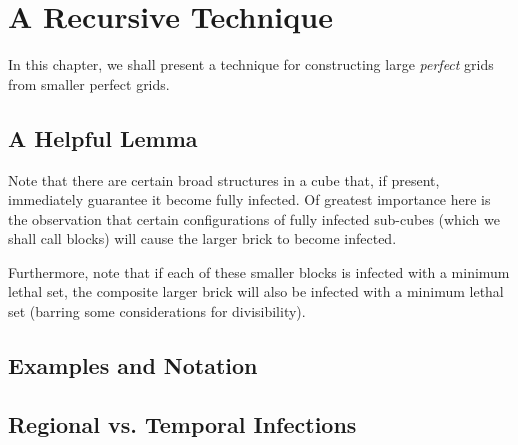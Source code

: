\chapter{A Recursive Technique}

In this chapter, we shall present a technique for constructing large \emph{perfect} grids from smaller perfect grids. 

\section{A Helpful Lemma}

Note that there are certain broad structures in a cube that, if present, immediately guarantee it become fully infected. Of greatest importance here is the observation that certain configurations of fully infected sub-cubes (which we shall call blocks) will cause the larger brick to become infected. 


Furthermore, note that if each of these smaller blocks is infected with a minimum lethal set, the composite larger brick will also be infected with a minimum lethal set (barring some considerations for divisibility).


\section{Examples and Notation}


\section{Regional vs. Temporal Infections}

